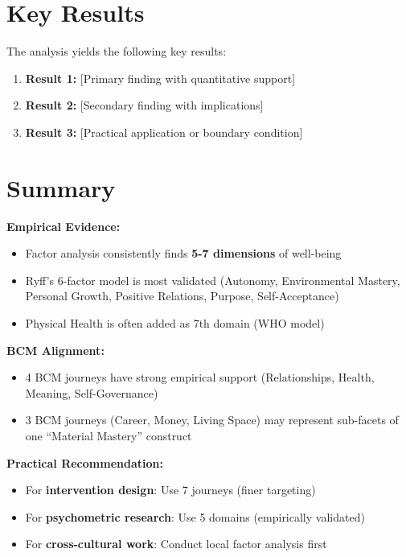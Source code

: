 

\section{Key Results}
\label{sec:bj-results}

The analysis yields the following key results:

\begin{enumerate}
    \item \textbf{Result 1:} [Primary finding with quantitative support]
    \item \textbf{Result 2:} [Secondary finding with implications]
    \item \textbf{Result 3:} [Practical application or boundary condition]
\end{enumerate}


\section{Summary}
\label{sec:bj-summary}

\begin{tcolorbox}[colback=yellow!5!white, colframe=yellow!75!black, title=Key Findings]

\textbf{Empirical Evidence:}
\begin{itemize}[nosep]
\item Factor analysis consistently finds \textbf{5-7 dimensions} of well-being
\item Ryff's 6-factor model is most validated (Autonomy, Environmental Mastery, Personal Growth, Positive Relations, Purpose, Self-Acceptance)
\item Physical Health is often added as 7th domain (WHO model)
\end{itemize}

\textbf{BCM Alignment:}
\begin{itemize}[nosep]
\item 4 BCM journeys have strong empirical support (Relationships, Health, Meaning, Self-Governance)
\item 3 BCM journeys (Career, Money, Living Space) may represent sub-facets of one ``Material Mastery'' construct
\end{itemize}

\textbf{Practical Recommendation:}
\begin{itemize}[nosep]
\item For \textbf{intervention design}: Use 7 journeys (finer targeting)
\item For \textbf{psychometric research}: Use 5 domains (empirically validated)
\item For \textbf{cross-cultural work}: Conduct local factor analysis first
\end{itemize}

\end{tcolorbox}

